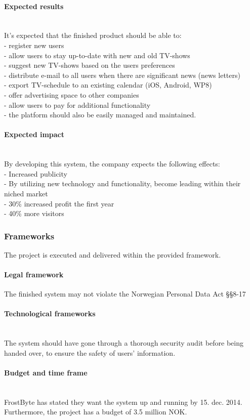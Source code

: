 \paragraph{Expected results}~\\
It’s expected that the finished product should be able to:\\
       -    register new users\\
       -    allow users to stay up-to-date with new and old TV-shows\\
       -    suggest new TV-shows based on the users preferences\\
       -    distribute e-mail to all users when there are significant news (news letters)\\
       -    export TV-schedule to an existing calendar (iOS, Android, WP8)\\
       -    offer advertising space to other companies\\
       -    allow users to pay for additional functionality\\
       -    the platform should also be easily managed and maintained. 

\paragraph{Expected impact}~\\
By developing this system, the company expects the following effects:\\
      -    Increased publicity\\
      -    By utilizing new technology and functionality, become leading within their niched market\\
      -    30\% increased profit the first year\\
      -    40\% more visitors

\subsubsection{Frameworks}
The project is executed and delivered within the provided framework.

\paragraph{Legal framework}

The finished system may not violate the Norwegian Personal Data Act §§8-17

\paragraph{Technological frameworks}~\\
The system should have gone through a thorough security audit before being handed over, to ensure the safety of users’ information.

\paragraph{Budget and time frame}~\\
FrostByte has stated they want the system up and running by 15. dec. 2014. Furthermore, the project has a budget of 3.5 million NOK.
